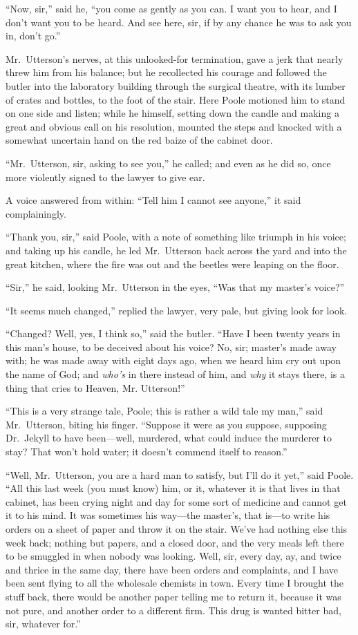 \documentclass[12pt,openright]{book}
\begin{document}
“Now, sir,” said he, “you come as gently as you can. I want you to hear, and I don’t want you to be heard. And see here, sir, if by any chance he was to ask you in, don’t go.”

Mr. Utterson’s nerves, at this unlooked-for termination, gave a jerk that nearly threw him from his balance; but he recollected his courage and followed the butler into the laboratory building through the surgical theatre, with its lumber of crates and bottles, to the foot of the stair. Here Poole motioned him to stand on one side and listen; while he himself, setting down the candle and making a great and obvious call on his resolution, mounted the steps and knocked with a somewhat uncertain hand on the red baize of the cabinet door.

“Mr. Utterson, sir, asking to see you,” he called; and even as he did so, once more violently signed to the lawyer to give ear.

A voice answered from within: “Tell him I cannot see anyone,” it said complainingly.

“Thank you, sir,” said Poole, with a note of something like triumph in his voice; and taking up his candle, he led Mr. Utterson back across the yard and into the great kitchen, where the fire was out and the beetles were leaping on the floor.

“Sir,” he said, looking Mr. Utterson in the eyes, “Was that my master’s voice?”

“It seems much changed,” replied the lawyer, very pale, but giving look for look.

“Changed? Well, yes, I think so,” said the butler. “Have I been twenty years in this man’s house, to be deceived about his voice? No, sir; master’s made away with; he was made away with eight days ago, when we heard him cry out upon the name of God; and \textit{who’s} in there instead of him, and \textit{why} it stays there, is a thing that cries to Heaven, Mr. Utterson!”

“This is a very strange tale, Poole; this is rather a wild tale my man,” said Mr. Utterson, biting his finger. “Suppose it were as you suppose, supposing Dr. Jekyll to have been—well, murdered, what could induce the murderer to stay? That won’t hold water; it doesn’t commend itself to reason.”

“Well, Mr. Utterson, you are a hard man to satisfy, but I’ll do it yet,” said Poole. “All this last week (you must know) him, or it, whatever it is that lives in that cabinet, has been crying night and day for some sort of medicine and cannot get it to his mind. It was sometimes his way—the master’s, that is—to write his orders on a sheet of paper and throw it on the stair. We’ve had nothing else this week back; nothing but papers, and a closed door, and the very meals left there to be smuggled in when nobody was looking. Well, sir, every day, ay, and twice and thrice in the same day, there have been orders and complaints, and I have been sent flying to all the wholesale chemists in town. Every time I brought the stuff back, there would be another paper telling me to return it, because it was not pure, and another order to a different firm. This drug is wanted bitter bad, sir, whatever for.”
\end{document}
